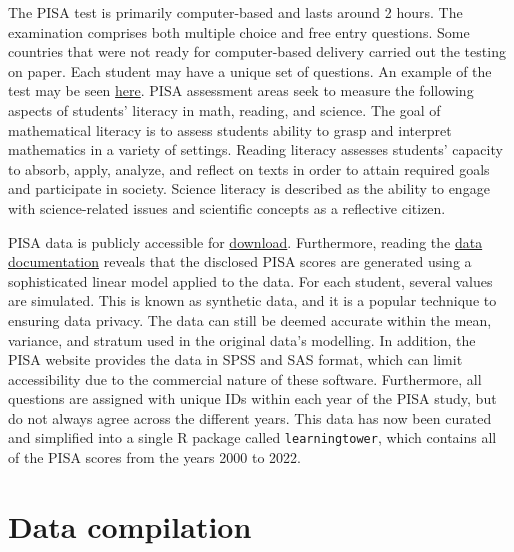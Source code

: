 The PISA test is primarily computer-based and lasts around 2 hours. The examination comprises both multiple choice and free entry questions. Some countries that were not ready for computer-based delivery carried out the testing on paper. Each student may have a unique set of questions. An example of the test may be seen \href{https://www.oecd.org/pisa/test/}{here}. PISA assessment areas seek to measure the following aspects of students' literacy in math, reading, and science. The goal of mathematical literacy is to assess students ability to grasp and interpret mathematics in a variety of settings. Reading literacy assesses students' capacity to absorb, apply, analyze, and reflect on texts in order to attain required goals and participate in society. Science literacy is described as the ability to engage with science-related issues and scientific concepts as a reflective citizen. \citep{test}

PISA data is publicly accessible for \href{https://www.oecd.org/pisa/data/}{download}. Furthermore, reading the \href{https://www.oecd.org/pisa/data/pisa2018technicalreport/Ch.09-Scaling-PISA-Data.pdf}{data documentation} reveals that the disclosed PISA scores are generated using a sophisticated linear model applied to the data. For each student, several values are simulated. \citep{scaling} This is known as synthetic data, and it is a popular technique to ensuring data privacy. The data can still be deemed accurate within the mean, variance, and stratum used in the original data's modelling. In addition, the PISA website provides the data in SPSS and SAS format, which can limit accessibility due to the commercial nature of these software. Furthermore, all questions are assigned with unique IDs within each year of the PISA study, but do not always agree across the different years. This data has now been curated and simplified into a single R package called \texttt{learningtower}, which contains all of the PISA scores from the years 2000 to 2022.

\section{Data compilation}\label{data-compilation}


